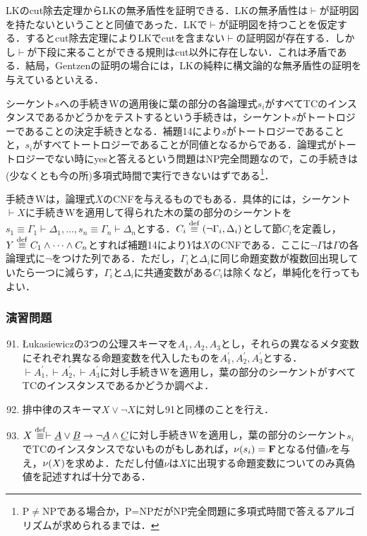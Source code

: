 \documentclass{ltjsarticle}
\theoremstyle{mystyle1}
\theoremstyle{mystyle3}
\theoremstyle{mystyle2}
\newcommand{\uA}{\underline{A}}
\newcommand{\uB}{\underline{B}}
\newcommand{\uC}{\underline{C}}
\newcommand{\bF}{\ensuremath{\mathbf{F}}}
\newcommand{\dequiv}{\ensuremath{\stackrel{\rm{def}}{\equiv}}}
\begin{document}
LKのcut除去定理からLKの無矛盾性を証明できる．LKの無矛盾性は$\vdash$が証明図を持たないということと同値であった．LKで$\vdash$が証明図を持つことを仮定する．するとcut除去定理によりLKでcutを含まない$\vdash$の証明図が存在する．しかし$\vdash$が下段に来ることができる規則はcut以外に存在しない．これは矛盾である．結局，Gentzenの証明の場合には，LKの純粋に構文論的な無矛盾性の証明を与えているといえる．

シーケント$s$への手続きWの適用後に葉の部分の各論理式$s_i$がすべてTCのインスタンスであるかどうかをテストするという手続きは，シーケント$s$がトートロジーであることの決定手続きとなる．補題14により$s$がトートロジーであることと，$s_i$がすべてトートロジーであることが同値となるからである．論理式がトートロジーでない時にyesと答えるという問題はNP完全問題なので，この手続きは(少なくとも今の所)多項式時間で実行できないはずである\footnote{P$\neq$NPである場合か，P=NPだがNP完全問題に多項式時間で答えるアルゴリズムが求められるまでは．}．

手続きWは，論理式$X$のCNFを与えるものでもある．具体的には，シーケント$\vdash X$に手続きWを適用して得られた木の葉の部分のシーケントを$s_1\equiv\Gamma_1\vdash\Delta_1,\ldots,s_n\equiv\Gamma_n\vdash\Delta_n$とする．$C_i\dequiv\qty(\neg\Gamma_i, \Delta_i)$として節$C_i$を定義し，$Y\dequiv C_1\wedge\cdots\wedge C_n$とすれば補題14により$Y$は$X$のCNFである．ここに$\neg\Gamma$は$\Gamma$の各論理式に$\neg$をつけた列である．ただし，$\Gamma_i$と$\Delta_i$に同じ命題変数が複数回出現していたら一つに減らす，$\Gamma_i$と$\Delta_i$に共通変数がある$C_i$は除くなど，単純化を行ってもよい．
\subsubsection*{演習問題}
\begin{enumerate}
  \setcounter{enumi}{90}
  \item \L ukasiewiczの3つの公理スキーマを$A_1, A_2, A_3$とし，それらの異なるメタ変数にそれぞれ異なる命題変数を代入したものを$A_1^\prime, A_2^\prime, A_3^\prime$とする．$\vdash A_1^\prime,\vdash A_2^\prime,\vdash A_3^\prime$に対し手続きWを適用し，葉の部分のシーケントがすべてTCのインスタンスであるかどうか調べよ．
  \item 排中律のスキーマ$X\vee\neg X$に対し91と同様のことを行え．
  \item $X\dequiv\vdash\uA\vee\uB\to\neg\uA\wedge\uC$に対し手続きWを適用し，葉の部分のシーケント$s_i$でTCのインスタンスでないものがもしあれば，$\nu\qty(s_i) = \bF$となる付値$\nu$を与え，$\nu\qty(X)$を求めよ．ただし付値$\nu$は$X$に出現する命題変数についてのみ真偽値を記述すれば十分である．
\end{enumerate}
\end{document}

